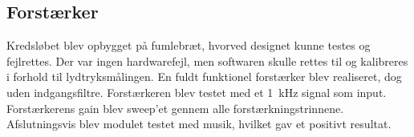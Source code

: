 \subsection{Forstærker}

Kredsløbet blev opbygget på fumlebræt, hvorved designet kunne testes og fejlrettes. Der var ingen hardwarefejl, men softwaren skulle rettes til og kalibreres i forhold til lydtryksmålingen.
En fuldt funktionel forstærker blev realiseret, dog uden indgangsfiltre. 
Forstærkeren blev testet med et \SI{1}{kHz} signal som input. Forstærkerens gain blev sweep’et gennem alle forstærkningstrinnene. Afslutningsvis blev modulet testet med musik, hvilket gav et positivt resultat.